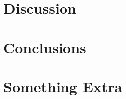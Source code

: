 \documentclass{kththesis}
\begin{document}
\chapter{Discussion}
\blindtext

\chapter{Conclusions}
\blindtext

\printbibliography[heading=bibintoc]

\appendix

\chapter{Something Extra}

\tailmatter
\end{document}
